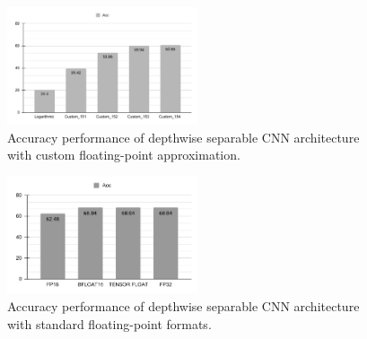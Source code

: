 \begin{figure}[t!]
	\centering
	\includegraphics[width=0.5\textwidth]{../figures/acc_depthwise_cifar_custom.pdf}
	\caption{Accuracy performance of depthwise separable CNN architecture with custom floating-point approximation.}
	\label{fig:acc_custom}
\end{figure}

\begin{figure}[t!]
	\centering
	\includegraphics[width=0.5\textwidth]{../figures/acc_depthwise_cifar_standard.pdf}
	\caption{Accuracy performance of depthwise separable CNN architecture with standard floating-point formats.}
	\label{fig:acc_standard}
\end{figure}